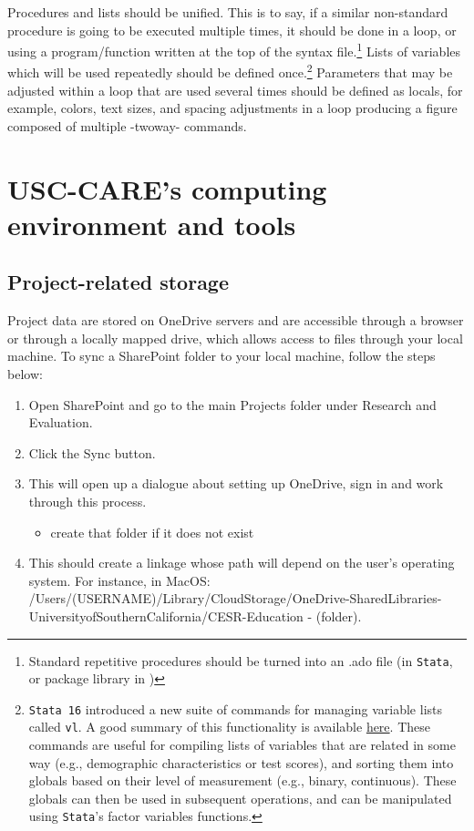 \documentclass[11pt]{article}
\begin{document}
{Procedures and lists should be unified. This is to say, if a similar non-standard procedure is going to be executed multiple times, it should be done in a loop, or using a program/function written at the top of the syntax file.\footnote{Standard repetitive procedures should be turned into an .ado file (in \texttt{Stata}, or package library in \faRProject)} Lists of variables which will be used repeatedly should be defined once.\footnote{\texttt{Stata 16} introduced a new suite of commands for managing variable lists called \texttt{vl}. A good summary of this functionality is available \href{https://errickson.net/stata-16/02-vl.html}{here}. These commands are useful for compiling lists of variables that are related in some way (e.g., demographic characteristics or test scores), and sorting them into globals based on their level of measurement (e.g., binary, continuous). These globals can then be used in subsequent operations, and can be manipulated using \texttt{Stata}'s factor variables functions.} Parameters that may be adjusted within a loop that are used several times should be defined as locals, for example, colors, text sizes, and spacing adjustments in a loop producing a figure composed of multiple -twoway- commands.

\section{USC-CARE's computing environment and tools} \label{sec:environment}

\subsection{Project-related storage}

Project data are stored on OneDrive servers and are accessible through a browser or through a locally mapped drive, which allows access to files through your local machine. To sync a SharePoint folder to your local machine, follow the steps below:

\begin{enumerate}
	\item Open SharePoint and go to the main Projects folder under Research and Evaluation.
	\item Click the Sync button.
	\item This will open up a dialogue about setting up OneDrive, sign in and work through this process.
	\begin{itemize}
		\item create that folder if it does not exist
	\end{itemize}
	\item This should create a linkage whose path will depend on the user's operating system. For instance, in MacOS: /Users/(USERNAME)/Library/CloudStorage/OneDrive-SharedLibraries-UniversityofSouthernCalifornia/CESR-Education - (folder).
\end{enumerate}


}
\end{document}
